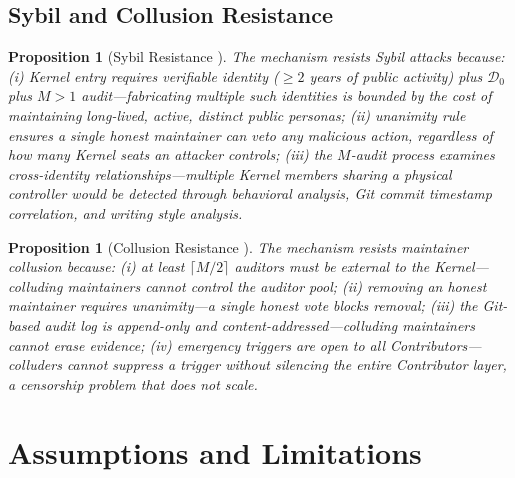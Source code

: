 \documentclass[12pt,a4paper]{article}
\newtheorem{proposition}[theorem]{Proposition}
\theoremstyle{definition}
\newcommand{\GzeroDecl}{\mathcal{D}_{0}}
\begin{document}
\subsection{Sybil and Collusion Resistance}
\begin{proposition}[Sybil Resistance ]
\label{prop:sybil}
The mechanism resists Sybil attacks because: (i) Kernel entry requires verifiable identity ($\geq 2$ years of public activity) plus $\GzeroDecl$ plus $M>1$ audit---fabricating multiple such identities is bounded by the cost of maintaining long-lived, active, distinct public personas; (ii) unanimity rule ensures a single honest maintainer can veto any malicious action, regardless of how many Kernel seats an attacker controls; (iii) the $M$-audit process examines cross-identity relationships---multiple Kernel members sharing a physical controller would be detected through behavioral analysis, Git commit timestamp correlation, and writing style analysis.
\end{proposition}
\begin{proposition}[Collusion Resistance ]
\label{prop:collusion}
The mechanism resists maintainer collusion because: (i) at least $\lceil M/2 \rceil$ auditors must be external to the Kernel---colluding maintainers cannot control the auditor pool; (ii) removing an honest maintainer requires unanimity---a single honest vote blocks removal; (iii) the Git-based audit log is append-only and content-addressed---colluding maintainers cannot erase evidence; (iv) emergency triggers are open to all Contributors---colluders cannot suppress a trigger without silencing the entire Contributor layer, a censorship problem that does not scale.
\end{proposition}
\section{Assumptions and Limitations}
\label{sec:limitations}
\end{document}
